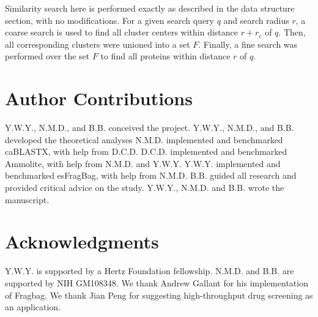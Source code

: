 \documentclass[review,preprint,12pt]{elsarticle}
\theoremstyle{definition}
\theoremstyle{remark}
\numberwithin{equation}{section}
\begin{document}
Similarity search here is performed exactly as described in the data structure section, with no modifications.
For a given search query $q$ and search radius $r$,
a coarse search is used to find all cluster centers within distance $r+r_c$ of $q$.
Then, all corresponding clusters were unioned into a set $F$.
Finally, a fine search was performed over the set $F$ to find all proteins within distance $r$ of $q$.

\section{Author Contributions}
Y.W.Y., N.M.D., and B.B. conceived the project.
Y.W.Y., N.M.D., and B.B. developed the theoretical analyses
N.M.D. implemented and benchmarked caBLASTX, with help from D.C.D.
D.C.D. implemented and benchmarked Ammolite, with help from N.M.D. and Y.W.Y.
Y.W.Y. implemented and benchmarked esFragBag, with help from N.M.D.
B.B. guided all research and provided critical advice on the study.
Y.W.Y., N.M.D. and B.B. wrote the manuscript.

\section{Acknowledgments}
Y.W.Y. is supported by a Hertz Foundation fellowship.
N.M.D. and B.B. are supported by NIH GM108348.
We thank Andrew Gallant for his implementation of Fragbag.
We thank Jian Peng for suggesting high-throughput drug screening as an application.


%

\end{document}
